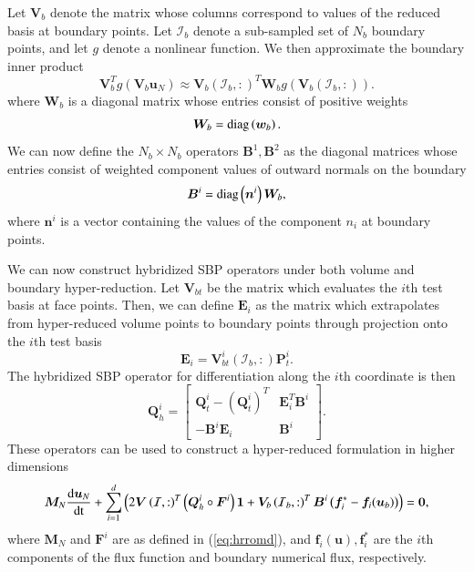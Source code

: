 \documentclass[preprint,10pt]{elsarticle}
\theoremstyle{definition}
\theoremstyle{lemma}
\theoremstyle{theorem}
\theoremstyle{assumption}
\newcommand{\td}[2]{\frac{{\rm d}#1}{{\rm d}{\rm #2}}}
\newcommand{\LRp}[1]{\left( #1 \right)}
\begin{document}
Let $\bm{V}_b$ denote the matrix whose columns correspond to values of the reduced basis at boundary points.  Let $\mathcal{I}_b$ denote a sub-sampled set of $N_b$ boundary points, and let $g$ denote a nonlinear function.  We then approximate the boundary inner product 
\[
\bm{V}_b^Tg(\bm{V}_b\bm{u}_N) \approx \bm{V}_b\LRp{\mathcal{I}_b,:}^T \bm{W}_b g\LRp{\bm{V}_b\LRp{\mathcal{I}_b,:}}.
\]
where $\bm{W}_b$ is a diagonal matrix whose entries consist of positive weights
\[
\bm{W}_b = {\rm diag}\LRp{\bm{w}_b}.
\]
We can now define the $N_b\times N_b$ operators $\bm{B}^1, \bm{B}^2$ as the diagonal matrices whose entries consist of weighted component values of outward normals on the boundary 
\[
\bm{B}^i = {\rm diag}\LRp{\bm{n}^i} \bm{W}_b,
\]
where $\bm{n}^i$ is a vector containing the values of the component $n_i$ at boundary points.  

We can now construct hybridized SBP operators under both volume and boundary hyper-reduction.  Let $\bm{V}_{bt}$ be the matrix which evaluates the $i$th test basis at face points.  Then, we can define $\bm{E}_i$ as the matrix which extrapolates from hyper-reduced volume points to boundary points through projection onto the $i$th test basis
\[
\bm{E}_i = \bm{V}_{bt}^i\LRp{\mathcal{I}_b,:}\bm{P}^i_t.  
\]
The hybridized SBP operator for differentiation along the $i$th coordinate is then
\[
\bm{Q}_h^i = \begin{bmatrix}
\bm{Q}^i_t - \LRp{\bm{Q}^i_t}^T & \bm{E}_i^T\bm{B}^i \\ 
-\bm{B}^i\bm{E}_i & \bm{B}^i
\end{bmatrix}.
\]
These operators can be used to construct a hyper-reduced formulation in higher dimensions
\begin{gather}
\bm{M}_N\td{\bm{u}_N}{t} + \sum_{i=1}^d \LRp{2\bm{V}\LRp{\mathcal{I},:}^T\LRp{\bm{Q}^i_h \circ \bm{F}^i}\bm{1} + \bm{V}_b\LRp{\mathcal{I}_b,:}^T\bm{B}^i\LRp{\bm{f}_i^* - \bm{f}_i(\bm{u}_b)}} = \bm{0} \label{eq:hrromdbc},%
\end{gather}
where $\bm{M}_N$ and $\bm{F}^i$ are as defined in (\ref{eq:hrromd}), and $\bm{f}_i(\bm{u}), \bm{f}_i^*$ are the $i$th components of the flux function and boundary numerical flux, respectively.  
\end{document}
